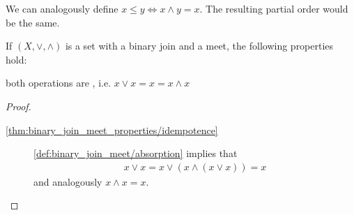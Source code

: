 \begin{note}\label{note:binary_join_meet_order}
  We can analogously define \( x \leq y \iff x \land y = x \). The resulting partial order would be the same.
\end{note}

\begin{proposition}\label{thm:binary_join_meet_properties}
  If \( (X, \lor, \land) \) is a set with a binary join and a meet, the following properties hold:
  \begin{defenum}
    \item\label{thm:binary_join_meet_properties/idempotence} both operations are , i.e. \( x \lor x = x = x \land x \)
  \end{defenum}
\end{proposition}
\begin{proof}
  \begin{description}
    \item[\ref{thm:binary_join_meet_properties/idempotence}] \ref{def:binary_join_meet/absorption} implies that
    \begin{align*}
      x \lor x = x \lor (x \land (x \lor x)) = x
    \end{align*}
    and analogously \( x \land x = x \).
  \end{description}
\end{proof}

